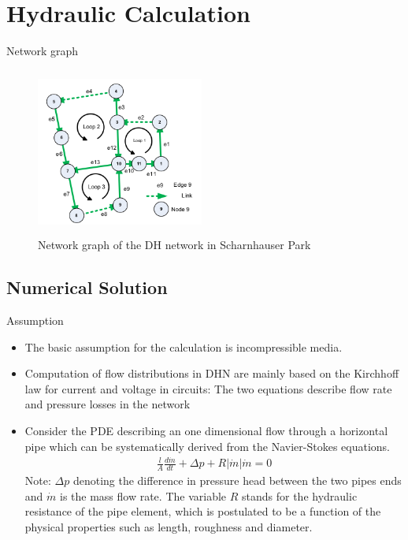 \documentclass[xcolor=dvipsnames]{beamer}
\begin{document}
\section{Hydraulic Calculation}

\begin{frame}{Network graph}
	 	\begin{figure}[!ht]
  			\centering
    		\includegraphics[width=5.5cm,height=5.5cm]{networkg.png}
    		 \caption[figure 3]{Network graph of the DH network in Scharnhauser Park}
    	\end{figure}
\end{frame}

\subsection{Numerical Solution}


\begin{frame}{Assumption}
\begin{itemize}
	\item 	The basic assumption for the calculation is incompressible media.
	\item 	Computation of flow distributions in DHN are mainly based on the Kirchhoff law for {\color{red}current} and {\color{blue}voltage} in circuits: The two equations describe {\color{red}flow rate} and {\color{blue}pressure losses} in the network
	\item 	Consider the PDE describing an one dimensional flow through a horizontal pipe which can be systematically derived from the Navier-Stokes equations.
\begin{align}
	\frac{l}{A}\frac{d\dot{m}}{dt}+\Delta p+R|\dot{m}|\dot{m}=0
\end{align}
Note: $\Delta p$ denoting the difference in pressure head between the two pipes ends and $\dot{m}$ is the mass flow rate. The variable $R$ stands for the hydraulic resistance of the pipe element, which is postulated to be a function of the physical properties such as length, roughness and diameter.
\end{itemize}
\end{frame}
\end{document}
